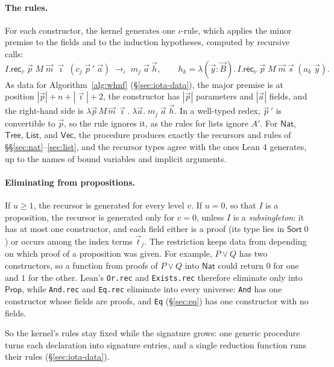 \documentclass[acmsmall,screen,nonacm]{acmart}
\newcommand{\Sort}[1]{\mathsf{Sort}\;#1}
\newcommand{\tLam}[3]{\lambda(#1{:}#2).\,#3}
\newcommand{\Nat}{\mathsf{Nat}}
\newcommand{\iotared}{\to_{\iota}}
\begin{document}
\paragraph{The rules.}
For each constructor, the kernel generates one $\iota$-rule, which applies the minor premise to the fields and to the induction hypotheses, computed by recursive calls:
\[
I.\mathsf{rec}_v\;\vec{p}\;M\;\vec{m}\;\vec{\imath}\;(c_j\;\vec{p}\,'\;\vec{a}) \;\iotared\; m_j\;\vec{a}\;\vec{h},
\qquad
h_k = \tLam{\vec{y}}{\vec{B}}{I.\mathsf{rec}_v\;\vec{p}\;M\;\vec{m}\;\vec{s}\;(a_k\;\vec{y})}.
\]
As data for Algorithm~\ref{alg:whnf} (\S\ref{sec:iota-data}), the major premise is at position $|\vec{p}| + n + |\vec{\imath}| + 2$,
the constructor has $|\vec{p}|$ parameters and $|\vec{a}|$ fields,
and the right-hand side is $\lambda \vec{p}\,M\,\vec{m}\,\vec{\imath}.\;\lambda \vec{a}.\; m_j\;\vec{a}\;\vec{h}$.
In a well-typed redex, $\vec{p}\,'$ is convertible to $\vec{p}$, so the rule ignores it, as the rules for lists ignore $A'$.
For $\Nat$, $\mathsf{Tree}$, $\mathsf{List}$, and $\mathsf{Vec}$, the procedure produces exactly the recursors and rules of \S\S\ref{sec:nat}--\ref{sec:list},
and the recursor types agree with the ones Lean 4 generates, up to the names of bound variables and implicit arguments.

\paragraph{Eliminating from propositions.}
If $u \ge 1$, the recursor is generated for every level $v$.
If $u = 0$, so that $I$ is a proposition, the recursor is generated only for $v = 0$, unless $I$ is a \emph{subsingleton}:
it has at most one constructor, and each field either is a proof (its type lies in $\Sort{0}$) or occurs among the index terms $\vec{t}_j$.
The restriction keeps data from depending on which proof of a proposition was given.
For example, $P \vee Q$ has two constructors, so a function from proofs of $P \vee Q$ into $\Nat$ could return $0$ for one and $1$ for the other.
Lean's \texttt{Or.rec} and \texttt{Exists.rec} therefore eliminate only into $\mathsf{Prop}$,
while \texttt{And.rec} and \texttt{Eq.rec} eliminate into every universe: \texttt{And} has one constructor whose fields are proofs, and \texttt{Eq} (\S\ref{sec:eq}) has one constructor with no fields.

So the kernel's rules stay fixed while the signature grows: one generic procedure turns each declaration into signature entries, and a single reduction function runs their rules (\S\ref{sec:iota-data}).
\end{document}
